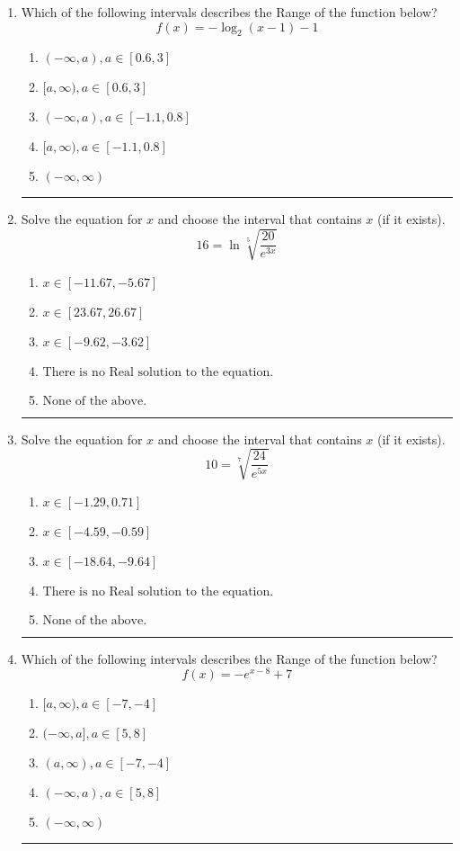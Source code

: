 \documentclass[14pt]{extbook}
\newcommand{\litem}[1]{\item#1\hspace*{-1cm}\rule{\textwidth}{0.4pt}}
\begin{document}
\begin{enumerate}
{\begin{enumerate}[label=\Alph*.]
\end{enumerate} }
\litem{
Which of the following intervals describes the Range of the function below?\[ f(x) = -\log_2{(x-1)}-1 \]\begin{enumerate}[label=\Alph*.]
\item \( (-\infty, a), a \in [0.6, 3] \)
\item \( [a, \infty), a \in [0.6, 3] \)
\item \( (-\infty, a), a \in [-1.1, 0.8] \)
\item \( [a, \infty), a \in [-1.1, 0.8] \)
\item \( (-\infty, \infty) \)

\end{enumerate} }
\litem{
 Solve the equation for $x$ and choose the interval that contains $x$ (if it exists).\[  16 = \ln{\sqrt[5]{\frac{20}{e^{3x}}}} \]\begin{enumerate}[label=\Alph*.]
\item \( x \in [-11.67, -5.67] \)
\item \( x \in [23.67, 26.67] \)
\item \( x \in [-9.62, -3.62] \)
\item \( \text{There is no Real solution to the equation.} \)
\item \( \text{None of the above.} \)

\end{enumerate} }
\litem{
 Solve the equation for $x$ and choose the interval that contains $x$ (if it exists).\[  10 = \sqrt[7]{\frac{24}{e^{5x}}} \]\begin{enumerate}[label=\Alph*.]
\item \( x \in [-1.29, 0.71] \)
\item \( x \in [-4.59, -0.59] \)
\item \( x \in [-18.64, -9.64] \)
\item \( \text{There is no Real solution to the equation.} \)
\item \( \text{None of the above.} \)

\end{enumerate} }
\litem{
Which of the following intervals describes the Range of the function below?\[ f(x) = -e^{x-8}+7 \]\begin{enumerate}[label=\Alph*.]
\item \( [a, \infty), a \in [-7, -4] \)
\item \( (-\infty, a], a \in [5, 8] \)
\item \( (a, \infty), a \in [-7, -4] \)
\item \( (-\infty, a), a \in [5, 8] \)
\item \( (-\infty, \infty) \)


\end{enumerate}}
\end{enumerate}
\end{document}
